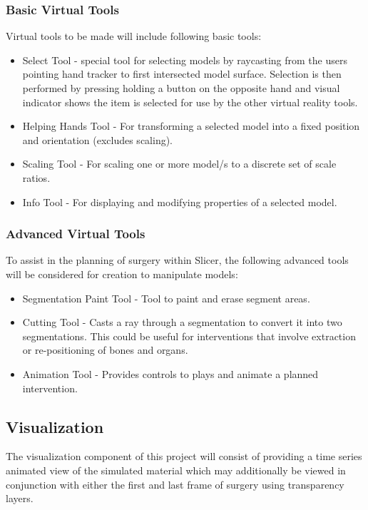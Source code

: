 \subsubsection{Basic Virtual Tools}
Virtual tools to be made will include following basic tools:
\begin{itemize}
\item Select Tool - special tool for selecting models by raycasting from the users pointing hand tracker to first intersected model surface. Selection is then performed by pressing holding a button on the opposite hand and visual indicator shows the item is selected for use by the other virtual reality tools.
\item Helping Hands Tool - For transforming a selected model into a fixed position and orientation (excludes scaling).
\item Scaling Tool - For scaling one or more model/s to a discrete set of scale ratios.
\item Info Tool - For displaying and modifying properties of a selected model.
\end{itemize}

\subsubsection{Advanced Virtual Tools}
To assist in the planning of surgery within Slicer, the following advanced tools will be considered for creation to manipulate models:
\begin{itemize}
\item Segmentation Paint Tool - Tool to paint and erase segment areas. 
\item Cutting Tool - Casts a ray through a segmentation to convert it into two segmentations. This could be useful for interventions that involve extraction or re-positioning of bones and organs. 
\item Animation Tool - Provides controls to plays and animate a planned intervention.
\end{itemize}

\subsection{Visualization}
The visualization component of this project will consist of providing a time series animated view of the simulated material which may additionally be viewed in conjunction with either the first and last frame of surgery using transparency layers.

